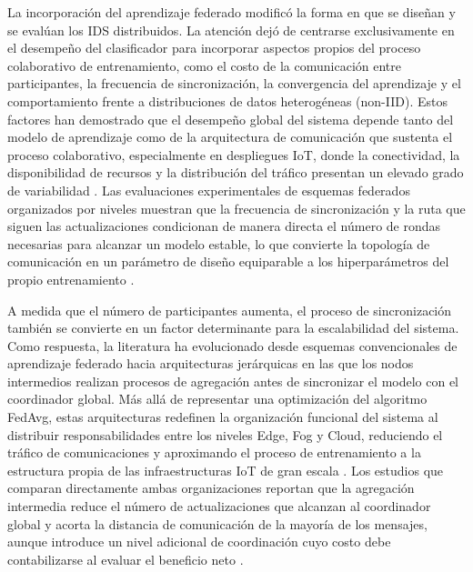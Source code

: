 \documentclass[journal,article,submit,moreauthors]{Definitions/mdpi}
\begin{document}
La incorporación del aprendizaje federado modificó la forma en que se diseñan y se evalúan los IDS distribuidos. La atención dejó de centrarse exclusivamente en el desempeño del clasificador para incorporar aspectos propios del proceso colaborativo de entrenamiento, como el costo de la comunicación entre participantes, la frecuencia de sincronización, la convergencia del aprendizaje y el comportamiento frente a distribuciones de datos heterogéneas (non-IID). Estos factores han demostrado que el desempeño global del sistema depende tanto del modelo de aprendizaje como de la arquitectura de comunicación que sustenta el proceso colaborativo, especialmente en despliegues IoT, donde la conectividad, la disponibilidad de recursos y la distribución del tráfico presentan un elevado grado de variabilidad \cite{Imteaj2022,Hajj2023,Chaurasia2024,Albanbay2025,Ramadan2025}. Las evaluaciones experimentales de esquemas federados organizados por niveles muestran que la frecuencia de sincronización y la ruta que siguen las actualizaciones condicionan de manera directa el número de rondas necesarias para alcanzar un modelo estable, lo que convierte la topología de comunicación en un parámetro de diseño equiparable a los hiperparámetros del propio entrenamiento \cite{Ma2024,Cooray2025}.

A medida que el número de participantes aumenta, el proceso de sincronización también se convierte en un factor determinante para la escalabilidad del sistema. Como respuesta, la literatura ha evolucionado desde esquemas convencionales de aprendizaje federado hacia arquitecturas jerárquicas en las que los nodos intermedios realizan procesos de agregación antes de sincronizar el modelo con el coordinador global. Más allá de representar una optimización del algoritmo FedAvg, estas arquitecturas redefinen la organización funcional del sistema al distribuir responsabilidades entre los niveles Edge, Fog y Cloud, reduciendo el tráfico de comunicaciones y aproximando el proceso de entrenamiento a la estructura propia de las infraestructuras IoT de gran escala \cite{Ficco2024,Tran2026,Ramadan2025}. Los estudios que comparan directamente ambas organizaciones reportan que la agregación intermedia reduce el número de actualizaciones que alcanzan al coordinador global y acorta la distancia de comunicación de la mayoría de los mensajes, aunque introduce un nivel adicional de coordinación cuyo costo debe contabilizarse al evaluar el beneficio neto \cite{Ma2024,Cooray2025}.
\end{document}
